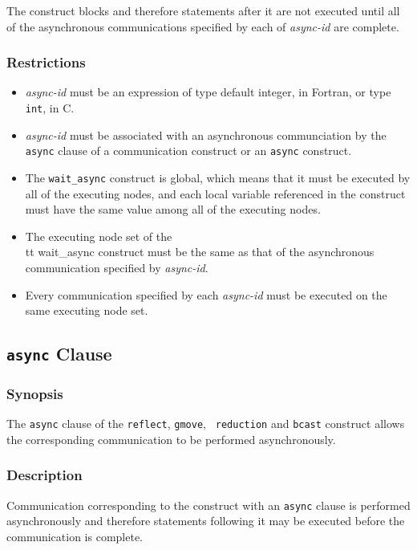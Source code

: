 The {\tt {}} construct blocks and therefore
statements after it are not executed until all of the asynchronous
communications specified by each of {\it async-id} are complete. 

\subsubsection*{Restrictions}

\begin{itemize}
 \item {\it async-id} must be an expression of type default integer, in
       Fortran, or type {\tt int}, in C.
\item {\it async-id} must be associated with an asynchronous
      communciation by the {\tt async} clause of a communication
      construct or an {\tt async} construct.
\item The {\tt wait\_async} construct is global, which means that it must
      be executed by all of the executing nodes, and each local variable
      referenced in the construct must have the same value among all of
      the executing nodes.
\item The executing node set of the {\\tt wait\_async} construct must be
      the same as that of the asynchronous communication specified by
      {\it async-id}.
\item Every communication specified by each {\it async-id} must be
      executed on the same executing node set.
\end{itemize}


\subsection{{\tt async} Clause}

\subsubsection*{Synopsis}

The {\tt async} clause of the {\tt reflect}, {\tt gmove}, {\tt
reduction} and {\tt bcast} construct allows the corresponding
communication to be performed asynchronously.

\subsubsection*{Description}

Communication corresponding to the construct with an {\tt async} clause
is performed asynchronously and therefore statements following it may be
executed before the communication is complete.

